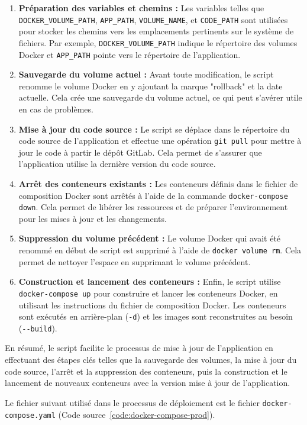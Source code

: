 \begin{enumerate}
    \item \textbf{Préparation des variables et chemins :} Les variables telles que \Verb|DOCKER_VOLUME_PATH|, \Verb|APP_PATH|, \Verb|VOLUME_NAME|, et \Verb|CODE_PATH| sont utilisées pour stocker les chemins vers les emplacements pertinents sur le système de fichiers. Par exemple, \Verb|DOCKER_VOLUME_PATH| indique le répertoire des volumes Docker et \Verb|APP_PATH| pointe vers le répertoire de l'application.
    \item \textbf{Sauvegarde du volume actuel :} Avant toute modification, le script renomme le volume Docker en y ajoutant la marque "rollback" et la date actuelle. Cela crée une sauvegarde du volume actuel, ce qui peut s'avérer utile en cas de problèmes.
    \item \textbf{Mise à jour du code source :} Le script se déplace dans le répertoire du code source de l'application et effectue une opération \Verb|git pull| pour mettre à jour le code à partir le dépôt GitLab. Cela permet de s'assurer que l'application utilise la dernière version du code source.
    \item \textbf{Arrêt des conteneurs existants :} Les conteneurs définis dans le fichier de composition Docker sont arrêtés à l'aide de la commande \Verb|docker-compose| \Verb|down|. Cela permet de libérer les ressources et de préparer l'environnement pour les mises à jour et les changements.
    \item \textbf{Suppression du volume précédent :} Le volume Docker qui avait été renommé en début de script est supprimé à l'aide de \Verb|docker volume rm|. Cela permet de nettoyer l'espace en supprimant le volume précédent.
    \item \textbf{Construction et lancement des conteneurs :} Enfin, le script utilise \Verb|docker-compose up| pour construire et lancer les conteneurs Docker, en utilisant les instructions du fichier de composition Docker. Les conteneurs sont exécutés en arrière-plan (\Verb|-d|) et les images sont reconstruites au besoin (\Verb|--build|).
\end{enumerate}

En résumé, le script facilite le processus de mise à jour de l'application en effectuant des étapes clés telles que la sauvegarde des volumes, la mise à jour du code source, l'arrêt et la suppression des conteneurs, puis la construction et le lancement de nouveaux conteneurs avec la version mise à jour de l'application.

Le fichier suivant utilisé dans le processus de déploiement est le fichier \Verb|docker-compose.yaml| (Code source~\ref{code:docker-compose-prod}).

